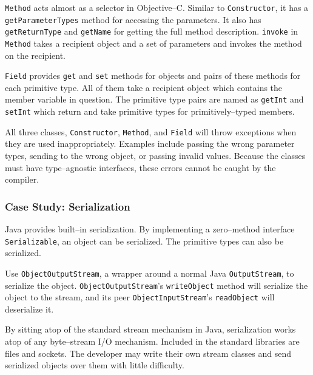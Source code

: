 \texttt{Method} acts almost as a selector in Objective--C. Similar to
\texttt{Constructor}, it has a \texttt{get\-Par\-am\-et\-er\-T\-yp\-es} method
for accessing the parameters. It also has \texttt{getReturnType} and
\texttt{getName} for getting the full method description. \texttt{invoke} in
\texttt{Method} takes a recipient object and a set of parameters and invokes
the method on the recipient.

\texttt{Field} provides \texttt{get} and \texttt{set} methods for objects and
pairs of these methods for each primitive type. All of them take a recipient
object which contains the member variable in question. The primitive type
pairs are named as \texttt{getInt} and \texttt{setInt} which return and take
primitive types for primitively--typed members.

All three classes, \texttt{Constructor}, \texttt{Method}, and \texttt{Field}
will throw exceptions when they are used inappropriately. Examples include
passing the wrong parameter types, sending to the wrong object, or passing
invalid values. Because the classes must have type--agnostic interfaces, these
errors cannot be caught by the compiler.


\subsubsection{Case Study: Serialization}

Java provides built--in serialization\cite{957325,944589,376846}. By
implementing a zero--method interface \texttt{Serializable}, an object can be
serialized. The primitive types can also be serialized.

Use \texttt{Obj\-ect\-Outp\-utStr\-eam}\cite{java-api}, a wrapper around a
normal Java \texttt{Out\-p\-ut\-Str\-eam}, to serialize the object.
\texttt{Obj\-ect\-Outp\-utStr\-eam}'s \texttt{writeObject} method will
serialize the object to the stream, and its peer
\texttt{Obj\-ect\-Inp\-utStr\-eam}'s \texttt{readObject} will deserialize it.

By sitting atop of the standard stream mechanism in Java, serialization works
atop of any byte--stream I/O mechanism. Included in the standard libraries are
files and sockets. The developer may write their own stream classes and send
serialized objects over them with little difficulty.

